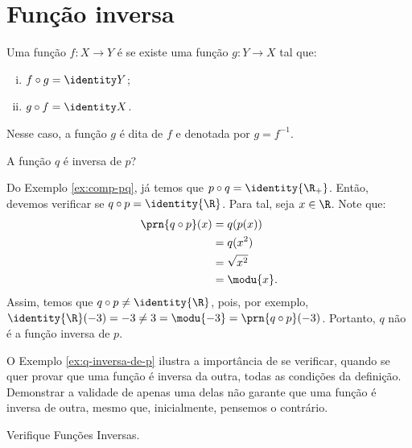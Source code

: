 \section{Função inversa}

\begin{definition}
\label{def:funcao-inversa}
Uma função $f: X \to Y$ é  se existe uma função $g: Y \to X$ tal que:
%
\begin{enumerate}[(i)]
  \item $f \circ g = \identity Y$;
  \item $g \circ f = \identity X$.
\end{enumerate}
%
Nesse caso, a função $g$ é dita  de $f$ e denotada por $g = f^{-1}$.
\end{definition}

\begin{example}
\label{ex:q-inversa-de-p}
    A função $q$ é inversa de $p$?
\end{example}

\begin{solution}
Do Exemplo \ref{ex:comp-pq}, já temos que $p \circ q = \identity{\R_+}$.
Então, devemos verificar se $q \circ p = \identity{\R}$.
Para tal, seja $x \in \R$. 
Note que:
%
\begin{align*}
    \prn{q \circ p}(x) &= q(p(x)) \\ &= q(x^2) \\ &= \sqrt{x^2} \\ &= \modu{x}.
\end{align*}
%
Assim, temos que $q \circ p \ne \identity{\R}$, pois, por exemplo, $\identity{\R}(-3) = -3 \ne 3 = \modu{-3} = \prn{q \circ p}(-3)$.
Portanto, $q$ não é a função inversa de $p$.
\end{solution}

O Exemplo \ref{ex:q-inversa-de-p} ilustra a importância de se verificar, quando se quer provar que uma função é inversa da outra, todas as condições da definição.
Demonstrar a validade de apenas uma delas não garante que uma função é inversa de outra, mesmo que, inicialmente, pensemos o contrário.

\begin{onlineact}
    {Verifique Funções Inversas}.
\end{onlineact}